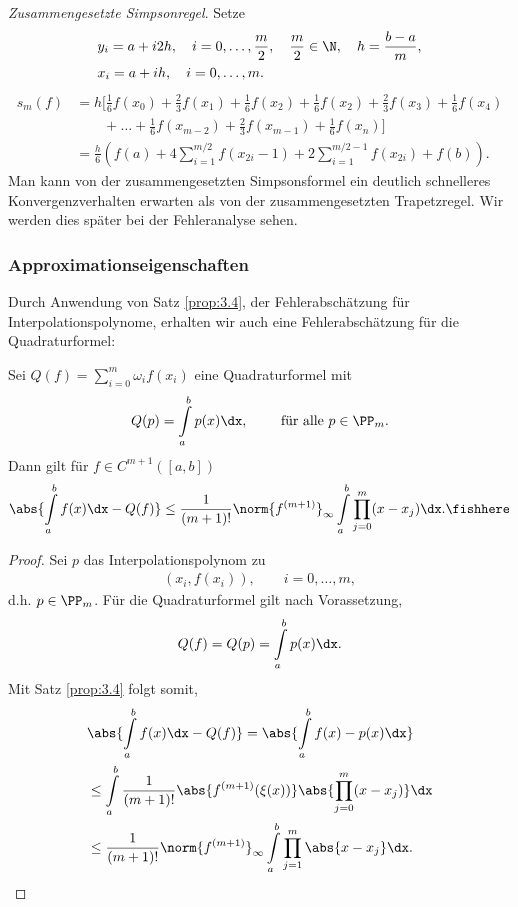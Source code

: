 \begin{bspn}
\textit{Zusammengesetzte Simpsonregel}. Setze
\begin{align*}
&y_i = a+i2h,\quad i=0,\ldots,\frac{m}{2},\quad \frac{m}{2}\in\N,\quad
h=\frac{b-a}{m},\\
&x_i = a+ih,\quad i=0,\ldots,m.
\end{align*}
\begin{align*}
s_m(f) &= h\bigg[\frac{1}{6}f(x_0) + \frac{2}{3}f(x_1) + \frac{1}{6}f(x_2)
+
 \frac{1}{6}f(x_2) + \frac{2}{3}f(x_3) + \frac{1}{6}f(x_4) \\ &\qquad+ \ldots
 + \frac{1}{6}f(x_{m-2}) + \frac{2}{3}f(x_{m-1})+\frac{1}{6}f(x_n)\bigg]\\
&= \frac{h}{6}\left(f(a)+4\sum\limits_{i=1}^{m/2} f(x_{2i}-1) +
2\sum\limits_{i=1}^{m/2-1} f(x_{2i}) + f(b)\right).
\end{align*}
Man kann von der zusammengesetzten Simpsonsformel ein deutlich schnelleres
Konvergenzverhalten erwarten als von der zusammengesetzten Trapetzregel. Wir
werden dies später bei der Fehleranalyse sehen.\bsphere
\end{bspn}

\subsubsection{Approximationseigenschaften}

Durch Anwendung von Satz \ref{prop:3.4}, der Fehlerabschätzung für
Interpolationspolynome, erhalten wir auch eine Fehlerabschätzung für die
Quadraturformel:
\begin{prop}
\label{prop:4.1}
Sei $Q(f) = \sum\limits_{i=0}^m \omega_i f(x_i)$ eine Quadraturformel mit
\begin{align*}
Q(p) = \int\limits_a^b p(x)\dx,\qquad\text{ für alle }p\in\PP_m. 
\end{align*}
Dann gilt für $f\in C^{m+1}([a,b])$
\begin{align*}
\abs{\int\limits_a^b f(x)\dx-Q(f) } \le \frac{1}{(m+1)!} \norm{f^{(m+1)}}_\infty
\int\limits_a^b \prod\limits_{j=0}^m (x-x_j)\dx.\fishhere
\end{align*}
\end{prop} 
\begin{proof}
Sei $p$ das Interpolationspolynom zu
\begin{align*}
(x_i,f(x_i)),\qquad i = 0,\ldots,m,
\end{align*}
d.h. $p\in\PP_m$. Für die Quadraturformel gilt nach Vorassetzung,
\begin{align*}
Q(f) = Q(p) = \int\limits_a^b p(x)\dx.
\end{align*}
Mit Satz \ref{prop:3.4} folgt somit,
\begin{align*}
&\abs{\int\limits_a^b f(x)\dx - Q(f)} = \abs{\int\limits_a^b f(x) - p(x)\dx}\\
&\le \int\limits_a^b \frac{1}{(m+1)!}\abs{f^{(m+1)}(\xi(x))}\abs{\prod
\limits_{j=0}^m (x-x_j)}\dx\\
&\le \frac{1}{(m+1)!} \norm{f^{(m+1)}}_\infty \int\limits_a^b
\prod\limits_{j=1}^m \abs{x-x_j}\dx.\qedhere
\end{align*}
\end{proof}

